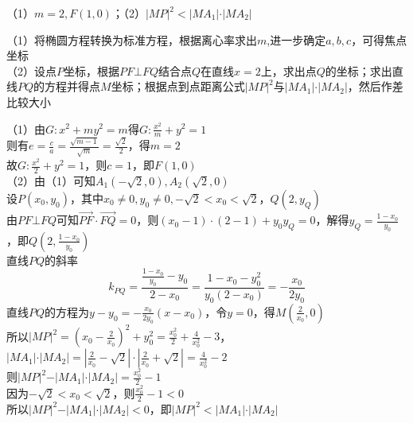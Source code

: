 \begin{corollary*}
（1）$m = 2, F(1, 0)$；（2）$\vert MP \vert ^2 < \vert MA_1 \vert \cdot \vert MA_2 \vert$
    
\end{corollary*}

\begin{property}
（1）将椭圆方程转换为标准方程，根据离心率求出$m$,进一步确定$a, b, c$，可得焦点坐标 \\
（2）设点$P$坐标，根据$PF \bot FQ$结合点$Q$在直线$x = 2$上，求出点$Q$的坐标；求出直线$PQ$的方程并得点$M$坐标；根据点到点距离公式$\vert MP \vert ^2$与$\vert MA_1\vert \cdot \vert MA_2 \vert$，然后作差比较大小
    
\end{property}

\begin{solution}
（1）由$G : x^2 + my^2 = m$得$G: \frac{x^2}{m} + y^2 = 1$ \\
则有$e = \frac{c}{a} = \frac{\sqrt{m - 1}}{\sqrt{m}} = \frac{\sqrt{2}}{2}$，得$m = 2$ \\
故$G: \frac{x^2}{2} + y^2 = 1$，则$c = 1$，即$F(1, 0)$ \\
（2）由（1）可知$A_1(-\sqrt{2}, 0), A_2(\sqrt{2}, 0)$ \\
设$P(x_0, y_0)$，其中$x_0 \ne 0, y_0 \ne 0, -\sqrt{2} < x_0 < \sqrt{2}$，$Q(2, y_Q)$ \\
由$PF \bot FQ$可知$\overrightarrow{PF} \cdot \overrightarrow{FQ} = 0$，则$(x_0 - 1) \cdot (2 - 1) + y_0 y_Q = 0$，解得$y_Q = \frac{1 - x_0}{y_0}$，即$Q\left(2, \frac{1 - x_0}{y_0}\right)$ \\
直线$PQ$的斜率
\[
k_{PQ} = \frac{\frac{1 - x_0}{y_0} - y_0}{2 - x_0} = \frac{1 - x_0 - y_0^2}{y_0(2 - x_0)} = -\frac{x_0}{2y_0}
\]
直线$PQ$的方程为$y - y_0 = -\frac{x_0}{2y_0}(x - x_0)$，令$y = 0$，得$M\left(\frac{2}{x_0}, 0\right)$ \\
所以$\vert MP \vert^2 = \left(x_0 - \frac{2}{x_0}\right)^2 + y_0^2 = \frac{x_0^2}{2} + \frac{4}{x_0^2} - 3$，$\vert MA_1 \vert \cdot \vert MA_2 \vert = \left\vert \frac{2}{x_0} - \sqrt{2} \right\vert \cdot \left\vert \frac{2}{x_0} + \sqrt{2} \right\vert = \frac{4}{x_0^2} - 2$ \\
则$\vert MP \vert^2 - \vert MA_1 \vert \cdot \vert MA_2 \vert = \frac{x_0^2}{2} - 1$ \\
因为$-\sqrt{2} < x_0 < \sqrt{2}$，则$\frac{x_0^2}{2} - 1 < 0$ \\
所以$\vert MP \vert^2 - \vert MA_1 \vert \cdot \vert MA_2 \vert < 0$，即$\vert MP \vert^2 < \vert MA_1 \vert \cdot \vert MA_2 \vert$
    
\end{solution}


